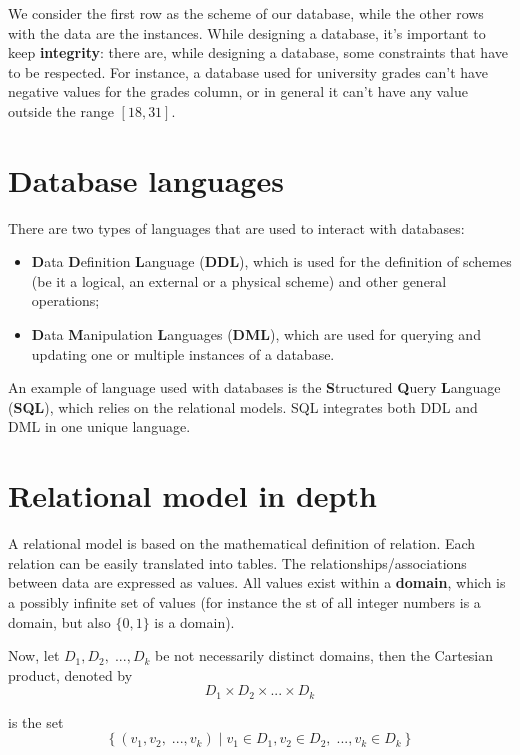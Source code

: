 We consider the first row as the scheme of our database, while the other rows with the data are the instances.
\nwl
While designing a database, it's important to keep \textbf{integrity}: there are, while designing a database, some constraints that have to be respected. For instance, a database used for university grades can't have negative values for the grades column, or in general it can't have any value outside the range $[18, 31]$.

\section{Database languages}

There are two types of languages that are used to interact with databases: 
\begin{itemize}
    \item \textbf{D}ata \textbf{D}efinition \textbf{L}anguage (\textbf{DDL}), which is used for the definition of schemes (be it a logical, an external or a physical scheme) and other general operations;
    \item \textbf{D}ata \textbf{M}anipulation \textbf{L}anguages (\textbf{DML}), which are used for querying and updating one or multiple instances of a database.
\end{itemize}

An example of language used with databases is the \textbf{S}tructured \textbf{Q}uery \textbf{L}anguage (\textbf{SQL}), which relies on the relational models. SQL integrates both DDL and DML in one unique language.

\section{Relational model in depth}

A relational model is based on the mathematical definition of relation. Each relation can be easily translated into tables. The relationships/associations between data are expressed as values. All values exist within a \textbf{domain}, which is a possibly infinite set of values (for instance the st of all integer numbers is a domain, but also $\{0, 1\}$ is a domain).

\begin{question}
    Now, let $D_1, D_2, \; ..., D_k$ be not necessarily distinct domains, then the Cartesian product, denoted by
    \[ D_1 \times D_2 \times ... \times D_k \]

    is the set
    \[ \left\{ (v_1, v_2, \;..., v_k) \; | \; v_1 \in D_1, v_2 \in D_2, \; ..., v_k \in D_k \right\} \]
\end{question}

